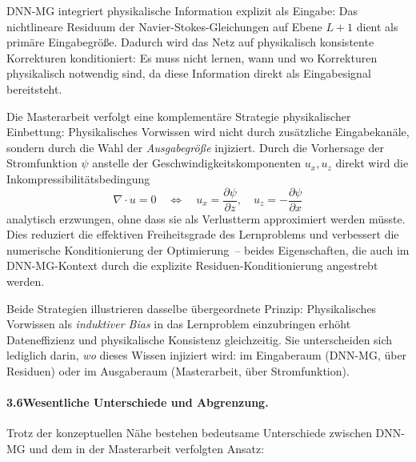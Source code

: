 \documentclass[a4paper,12pt]{article}
\begin{document}
DNN-MG integriert physikalische Information explizit als Eingabe: Das nichtlineare
Residuum der Navier-Stokes-Gleichungen auf Ebene $L+1$ dient als primäre
Eingabegröße. Dadurch wird das Netz auf physikalisch konsistente Korrekturen
konditioniert: Es muss nicht lernen, wann und wo Korrekturen physikalisch
notwendig sind, da diese Information direkt als Eingabesignal bereitsteht.

Die Masterarbeit verfolgt eine komplementäre Strategie physikalischer
Einbettung: Physikalisches Vorwissen wird nicht durch zusätzliche
Eingabekanäle, sondern durch die Wahl der \emph{Ausgabegröße}
injiziert. Durch die Vorhersage der Stromfunktion $\psi$ anstelle
der Geschwindigkeitskomponenten $u_x, u_z$ direkt wird die
Inkompressibilitätsbedingung
\begin{equation}
    \nabla \cdot u = 0 \quad \Longleftrightarrow \quad
    u_x = \frac{\partial \psi}{\partial z},\quad u_z = -\frac{\partial \psi}{\partial x}
\end{equation}
analytisch erzwungen, ohne dass sie als Verlustterm approximiert
werden müsste. Dies reduziert die effektiven Freiheitsgrade des
Lernproblems und verbessert die numerische Konditionierung der
Optimierung~-- beides Eigenschaften, die auch im DNN-MG-Kontext
durch die explizite Residuen-Konditionierung angestrebt werden.

Beide Strategien illustrieren dasselbe übergeordnete Prinzip:
Physikalisches Vorwissen als \emph{induktiver Bias} in das
Lernproblem einzubringen erhöht Dateneffizienz und physikalische
Konsistenz gleichzeitig. Sie unterscheiden sich lediglich darin,
\emph{wo} dieses Wissen injiziert wird: im Eingaberaum
(DNN-MG, über Residuen) oder im Ausgaberaum (Masterarbeit,
über Stromfunktion).

\paragraph{3.6\quad Wesentliche Unterschiede und Abgrenzung.}

Trotz der konzeptuellen Nähe bestehen bedeutsame Unterschiede
zwischen DNN-MG und dem in der Masterarbeit verfolgten Ansatz:
\end{document}
